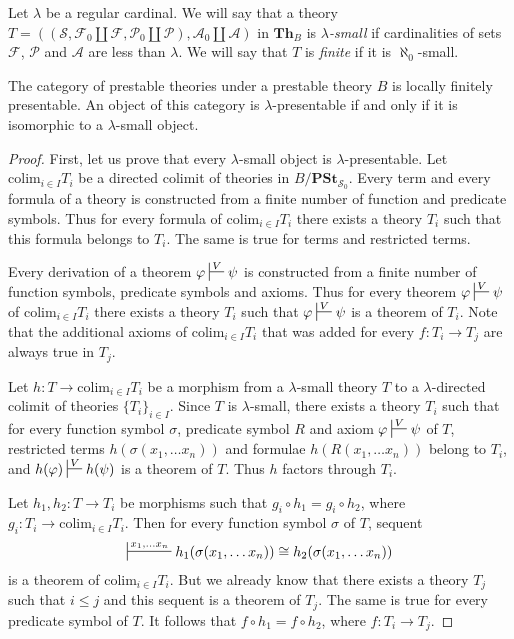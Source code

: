 \documentclass[reqno]{amsart}
\theoremstyle{definition}
\theoremstyle{remark}
\newcommand{\cat}[1]{\mathbf{#1}}
\newcommand{\colim}{\mathrm{colim}}
\newcommand{\Th}{\cat{Th}}
\newcommand{\PSt}{\cat{PSt}}
\numberwithin{figure}{section}
\begin{document}
Let $\lambda$ be a regular cardinal.
We will say that a theory $T = ((\mathcal{S}, \mathcal{F}_0 \amalg \mathcal{F}, \mathcal{P}_0 \amalg \mathcal{P}), \mathcal{A}_0 \amalg \mathcal{A})$
in $\Th_B$ is \emph{$\lambda$-small} if cardinalities of sets $\mathcal{F}$, $\mathcal{P}$ and $\mathcal{A}$ are less than $\lambda$.
We will say that $T$ is \emph{finite} if it is $\aleph_0$-small.

\begin{prop}
The category of prestable theories under a prestable theory $B$ is locally finitely presentable.
An object of this category is $\lambda$-presentable if and only if it is isomorphic to a $\lambda$-small object.
\end{prop}
\begin{proof}
First, let us prove that every $\lambda$-small object is $\lambda$-presentable.
Let $\colim_{i \in I} T_i$ be a directed colimit of theories in $B/\PSt_{\mathcal{S}_0}$.
Every term and every formula of a theory is constructed from a finite number of function and predicate symbols.
Thus for every formula of $\colim_{i \in I} T_i$ there exists a theory $T_i$ such that this formula belongs to $T_i$.
The same is true for terms and restricted terms.

Every derivation of a theorem $\varphi \sststile{}{V} \psi$ is constructed from a finite number of function symbols, predicate symbols and axioms.
Thus for every theorem $\varphi \sststile{}{V} \psi$ of $\colim_{i \in I} T_i$ there exists a theory $T_i$ such that $\varphi \sststile{}{V} \psi$ is a theorem of $T_i$.
Note that the additional axioms of $\colim_{i \in I} T_i$ that was added for every $f : T_i \to T_j$ are always true in $T_j$.

Let $h : T \to \colim_{i \in I} T_i$ be a morphism from a $\lambda$-small theory $T$ to a $\lambda$-directed colimit of theories $\{ T_i \}_{i \in I}$.
Since $T$ is $\lambda$-small, there exists a theory $T_i$ such that for every function symbol $\sigma$, predicate symbol $R$ and axiom $\varphi \sststile{}{V} \psi$ of $T$,
restricted terms $h(\sigma(x_1, \ldots x_n))$ and formulae $h(R(x_1, \ldots x_n))$ belong to $T_i$, and $h(\varphi) \sststile{}{V} h(\psi)$ is a theorem of $T$.
Thus $h$ factors through $T_i$.

Let $h_1,h_2 : T \to T_i$ be morphisms such that $g_i \circ h_1 = g_i \circ h_2$, where $g_i : T_i \to \colim_{i \in I} T_i$.
Then for every function symbol $\sigma$ of $T$, sequent
\[ \sststile{}{x_1, \ldots x_n} h_1(\sigma(x_1, \ldots x_n)) \cong h_2(\sigma(x_1, \ldots x_n)) \]
is a theorem of $\colim_{i \in I} T_i$.
But we already know that there exists a theory $T_j$ such that $i \leq j$ and this sequent is a theorem of $T_j$.
The same is true for every predicate symbol of $T$.
It follows that $f \circ h_1 = f \circ h_2$, where $f : T_i \to T_j$.


\end{proof}
\end{document}
